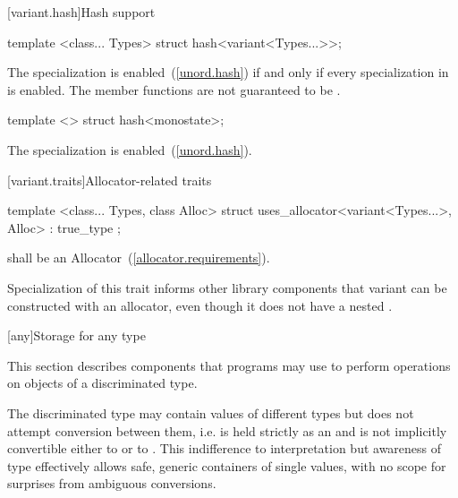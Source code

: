 [variant.hash]{Hash support}

%
\begin{itemdecl}
template <class... Types> struct hash<variant<Types...>>;
\end{itemdecl}

\begin{itemdescr}
\pnum
The specialization  is enabled~(\ref{unord.hash})
if and only if every specialization in  is enabled.
The member functions are not guaranteed to be .
\end{itemdescr}

%
\begin{itemdecl}
template <> struct hash<monostate>;
\end{itemdecl}

\begin{itemdescr}
\pnum
The specialization is enabled~(\ref{unord.hash}).
\end{itemdescr}


[variant.traits]{Allocator-related traits}

%
\begin{itemdecl}
template <class... Types, class Alloc>
  struct uses_allocator<variant<Types...>, Alloc> : true_type { };
\end{itemdecl}

\begin{itemdescr}
\pnum
\requires {} shall be an Allocator~(\ref{allocator.requirements}).

\pnum
\begin{note}
Specialization of this trait informs other library components
that variant can be constructed with an allocator,
even though it does not have a nested .
\end{note}
\end{itemdescr}


[any]{Storage for any type}

\pnum
This section describes components that \Cpp programs may use to perform operations on objects of a discriminated type.

\pnum
\begin{note}
The discriminated type may contain values of different types but does not attempt conversion between them,
i.e.  is held strictly as an  and is not implicitly convertible either to  or to .
This indifference to interpretation but awareness of type effectively allows safe, generic containers of single values, with no scope for surprises from ambiguous conversions.
\end{note}

